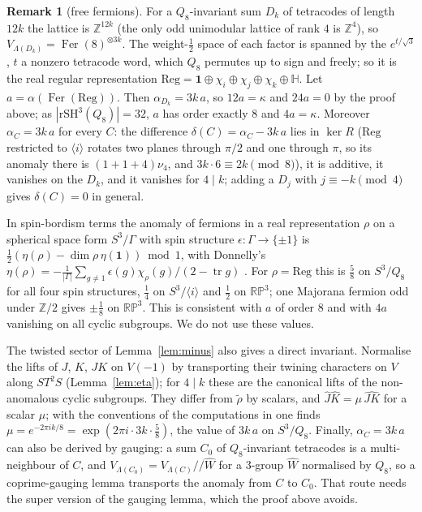 \documentclass[11pt]{amsart}
\theoremstyle{definition}
\newtheorem{remark}[theorem]{Remark}
\newcommand{\Z}{\mathbb{Z}}
\newcommand{\Fer}{\operatorname{Fer}}
\newcommand{\Reg}{\mathrm{Reg}}
\newcommand{\rSH}{\mathrm{rSH}^3}
\newcommand{\orb}{/\!\!/}
\begin{document}
\begin{remark}[free fermions]\label{rem:freefermions}
For a $Q_8$-invariant sum $D_k$ of tetracodes of length $12k$ the lattice is $\Z^{12k}$ (the only odd
unimodular lattice of rank $4$ is $\Z^4$), so $V_{\Lambda(D_k)}=\Fer(8)^{\otimes3k}$. The weight-$\frac12$
space of each factor is spanned by the $e^{t/\sqrt3}$, $t$ a nonzero tetracode word, which $Q_8$ permutes
up to sign and freely; so it is the real regular representation
$\Reg=\mathbf 1\oplus\chi_i\oplus\chi_j\oplus\chi_k\oplus\mathbb H$. Let $a=\alpha(\Fer(\Reg))$. Then
$\alpha_{D_k}=3k\,a$, so $12a=\kappa$ and $24a=0$ by the proof above; as $|\rSH(Q_8)|=32$, $a$ has order
exactly $8$ and $4a=\kappa$. Moreover $\alpha_C=3k\,a$ for every $C$: the difference $\delta(C)=\alpha_C-
3k\,a$ lies in $\ker R$ ($\Reg$ restricted to $\langle i\rangle$ rotates two planes through $\pi/2$ and one
through $\pi$, so its anomaly there is $(1+1+4)\nu_4$, and $3k\cdot6\equiv2k\pmod8$), it is additive, it
vanishes on the $D_k$, and it vanishes for $4\mid k$; adding a $D_j$ with $j\equiv-k\pmod4$ gives
$\delta(C)=0$ in general.

In spin-bordism terms the anomaly of fermions in a real representation $\rho$ on a spherical space form
$S^3/\Gamma$ with spin structure $\epsilon\colon\Gamma\to\{\pm1\}$ is
$\frac12(\eta(\rho)-\dim\rho\,\eta(\mathbf 1))\bmod1$, with Donnelly's
$\eta(\rho)=-\frac1{|\Gamma|}\sum_{g\ne1}\epsilon(g)\chi_\rho(g)/(2-\operatorname{tr}g)$ \cite{Donnelly}. For
$\rho=\Reg$ this is $\frac58$ on $S^3/Q_8$ for all four spin structures, $\frac14$ on $S^3/\langle
i\rangle$ and $\frac12$ on $\mathbb{RP}^3$; one Majorana fermion odd under $\Z/2$ gives $\pm\frac18$ on
$\mathbb{RP}^3$. This is consistent with $a$ of order $8$ and with $4a$ vanishing on all cyclic
subgroups. We do not use these values.

The twisted sector of Lemma~\ref{lem:minus} also gives a direct invariant. Normalise the lifts of $J$, $K$,
$JK$ on $V(-1)$ by transporting their twining characters on $V$ along $ST^2S$ (Lemma~\ref{lem:eta}); for
$4\mid k$ these are the canonical lifts of the non-anomalous cyclic subgroups. They differ from
$\tilde\rho$ by scalars, and $\hat J\hat K=\mu\,\widehat{JK}$ for a scalar $\mu$; with the conventions of
the computations in \cite{repo} one finds $\mu=e^{-2\pi ik/8}=\exp(2\pi i\cdot3k\cdot\frac58)$, the value of
$3k\,a$ on $S^3/Q_8$. Finally, $\alpha_C=3k\,a$ can
also be derived by gauging: a sum $C_0$ of $Q_8$-invariant tetracodes is a multi-neighbour of $C$, and
$V_{\Lambda(C_0)}=V_{\Lambda(C)}\orb\widehat W$ for a $3$-group $\widehat W$ normalised by $Q_8$, so a
coprime-gauging lemma \cite{Naidu,Uribe,Tachikawa} transports the anomaly from $C$ to $C_0$. That route
needs the super version of the gauging lemma, which the proof above avoids.
\end{remark}
\end{document}
